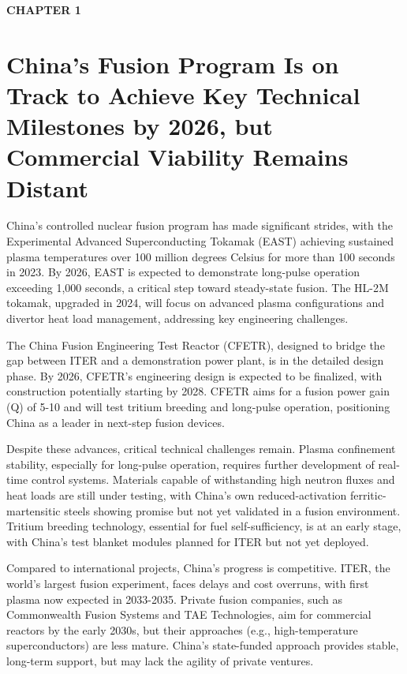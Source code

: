 \documentclass[11pt,a4paper]{article}
\newcommand{\kicker}[1]{\textcolor{BOBlue}{\scriptsize\bfseries\MakeUppercase{#1}}\\[-2pt]}
\newcommand{\lead}[1]{\textcolor{BOBlue}{\large #1}\par\vspace{3pt}}
\begin{document}
\clearpage
\kicker{Chapter 1}
\section*{China's Fusion Program Is on Track to Achieve Key Technical Milestones by 2026, but Commercial Viability Remains Distant}
\lead{}
{\small China's controlled nuclear fusion program has made significant strides, with the Experimental Advanced Superconducting Tokamak (EAST) achieving sustained plasma temperatures over 100 million degrees Celsius for more than 100 seconds in 2023. By 2026, EAST is expected to demonstrate long-pulse operation exceeding 1,000 seconds, a critical step toward steady-state fusion. The HL-2M tokamak, upgraded in 2024, will focus on advanced plasma configurations and divertor heat load management, addressing key engineering challenges.}

{\small The China Fusion Engineering Test Reactor (CFETR), designed to bridge the gap between ITER and a demonstration power plant, is in the detailed design phase. By 2026, CFETR's engineering design is expected to be finalized, with construction potentially starting by 2028. CFETR aims for a fusion power gain (Q) of 5-10 and will test tritium breeding and long-pulse operation, positioning China as a leader in next-step fusion devices.}

{\small Despite these advances, critical technical challenges remain. Plasma confinement stability, especially for long-pulse operation, requires further development of real-time control systems. Materials capable of withstanding high neutron fluxes and heat loads are still under testing, with China's own reduced-activation ferritic-martensitic steels showing promise but not yet validated in a fusion environment. Tritium breeding technology, essential for fuel self-sufficiency, is at an early stage, with China's test blanket modules planned for ITER but not yet deployed.}

{\small Compared to international projects, China's progress is competitive. ITER, the world's largest fusion experiment, faces delays and cost overruns, with first plasma now expected in 2033-2035. Private fusion companies, such as Commonwealth Fusion Systems and TAE Technologies, aim for commercial reactors by the early 2030s, but their approaches (e.g., high-temperature superconductors) are less mature. China's state-funded approach provides stable, long-term support, but may lack the agility of private ventures.}
\end{document}
